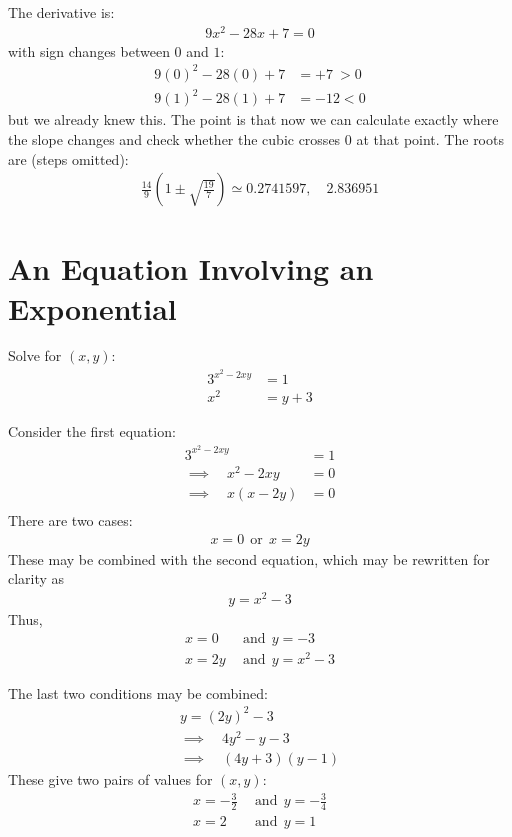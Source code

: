 \documentclass[12pt]{article}
\begin{document}
\begin{answer}
The derivative is:
\begin{align*}
9 x^{2} - 28 x + 7 = 0
\end{align*}
with sign changes between $0$ and $1$:
\begin{align*}
9(0)^{2} - 28(0) + 7 & = +7 ~ > 0 \\
9(1)^{2} - 28(1) + 7 & = -12 < 0 
\end{align*}
but we already knew this. The point is that now we can calculate exactly where the slope changes and check whether the cubic crosses $0$ at that point. The roots are (steps omitted):
\begin{align*}
\frac{14}{9} \left(1 \pm \sqrt{\frac{19}{7}}\right) 
\simeq 0.2741597, \hspace{1em} 2.836951 
\end{align*}

\end{answer}


\section*{An Equation Involving an Exponential}
Solve for $(x,y)$:
\begin{align*}
3^{x^{2}-2xy} & = 1 \\
x^{2} & = y + 3
\end{align*}

\begin{answer}
Consider the first equation:
\begin{align*}
3^{x^{2}-2xy} & = 1 \\
\implies \hspace{1em} 
x^{2}-2xy & = 0 \\
\implies \hspace{1em} 
x(x-2y) & = 0 \\
\end{align*}
There are two cases:
\begin{align*}
x = 0 ~~\text{or}~~ x=2y
\end{align*}
These may be combined with the second equation, which may be rewritten for clarity as
\begin{align*}
y = x^{2} - 3
\end{align*}
Thus,
\begin{align*}
x = 0 & ~~\text{and}~~ y = -3 \\
x = 2y & ~~\text{and}~~ y = x^{2} - 3
\end{align*}

The last two conditions may be combined:
\begin{align*}
y = (2y)^{2} - 3 \\
\implies \hspace{1em} 
4 y^{2} - y - 3 \\
\implies \hspace{1em} 
(4y + 3) (y - 1)
\end{align*}
These give two pairs of values for $(x,y)$:
\begin{align*}
x = -\frac{3}{2} & ~~\text{and}~~ y = -\frac{3}{4} \\
x = 2 & ~~\text{and}~~ y = 1
\end{align*}
\end{answer}
\end{document}
